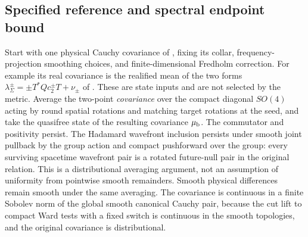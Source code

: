 \documentclass[11pt]{article}
\begin{document}
\subsection{Specified reference and spectral endpoint bound}

Start with one physical Cauchy covariance of \cite{p09}, fixing its collar, frequency-projection smoothing choices, and finite-dimensional Fredholm correction. For example its real covariance is the realified mean of the two forms \(\lambda_\Sigma^\pm=\pm T^*Q c_2^\pm T+\nu_\pm\) of \cite{p09}. These are state inputs and are not selected by the metric. Average the two-point \emph{covariance} over the compact diagonal \(SO(4)\) acting by round spatial rotations and matching target rotations at the seed, and take the quasifree state of the resulting covariance \(\mu_{\rm b}\). The commutator and positivity persist. The Hadamard wavefront inclusion persists under smooth joint pullback by the group action and compact pushforward over the group: every surviving spacetime wavefront pair is a rotated future-null pair in the original relation. This is a distributional averaging argument, not an assumption of uniformity from pointwise smooth remainders. Smooth physical differences remain smooth under the same averaging. The covariance is continuous in a finite Sobolev norm of the global smooth canonical Cauchy pair, because the cut lift to compact Ward tests with a fixed switch is continuous in the smooth topologies, and the original covariance is distributional.
\end{document}
